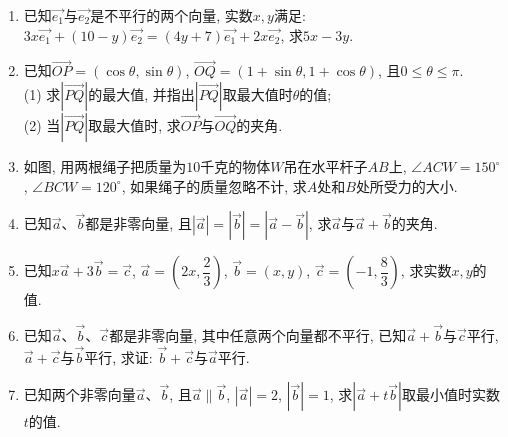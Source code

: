 \documentclass[10pt,a4paper]{article}
\begin{document}
\begin{enumerate}[1.]
\item 已知$\overrightarrow{e_1}$与$\overrightarrow{e_2}$是不平行的两个向量, 实数$x,y$满足: $3x\overrightarrow{e_1}+(10-y)\overrightarrow{e_2}=(4y+7)\overrightarrow{e_1}+2x\overrightarrow{e_2}$, 求$5x-3y$.
\item 已知$\overrightarrow{OP}=(\cos \theta ,\sin \theta)$, $\overrightarrow{OQ}=(1+\sin \theta ,1+\cos \theta)$, 且$0\le \theta \le \pi$.\\
(1) 求$|\overrightarrow{PQ}|$的最大值, 并指出$|\overrightarrow{PQ}|$取最大值时$\theta$的值;\\
(2) 当$|\overrightarrow{PQ}|$取最大值时, 求$\overrightarrow{OP}$与$\overrightarrow{OQ}$的夹角.
\item 如图, 用两根绳子把质量为$10$千克的物体$W$吊在水平杆子$AB$上, $\angle ACW=150^{\circ }$, $\angle BCW=120^{\circ }$, 如果绳子的质量忽略不计, 求$A$处和$B$处所受力的大小.
\begin{center}
\end{center}
\item 已知$\overrightarrow a$、$\overrightarrow b$都是非零向量, 且$|\overrightarrow a|=|\overrightarrow b|=|\overrightarrow a-\overrightarrow b|$, 求$\overrightarrow a$与$\overrightarrow a+\overrightarrow b$的夹角.
\item 已知$x\overrightarrow a+3\overrightarrow b=\overrightarrow c$, $\overrightarrow a=(2x,\dfrac 23)$, $\overrightarrow b=(x,y)$, $\overrightarrow c=(-1,\dfrac 83)$, 求实数$x,y$的值.
\item 已知$\overrightarrow a$、$\overrightarrow b$、$\overrightarrow c$都是非零向量, 其中任意两个向量都不平行, 已知$\overrightarrow a+\overrightarrow b$与$\overrightarrow c$平行, $\overrightarrow a+\overrightarrow c$与$\overrightarrow b$平行, 求证: $\overrightarrow b+\overrightarrow c$与$\overrightarrow a$平行.
\item 已知两个非零向量$\overrightarrow a$、$\overrightarrow b$, 且$\overrightarrow a\parallel \overrightarrow b$, $|\overrightarrow a|=2$, $|\overrightarrow b|=1$, 求$|\overrightarrow a+t\overrightarrow b|$取最小值时实数$t$的值.

\end{enumerate}
\end{document}
